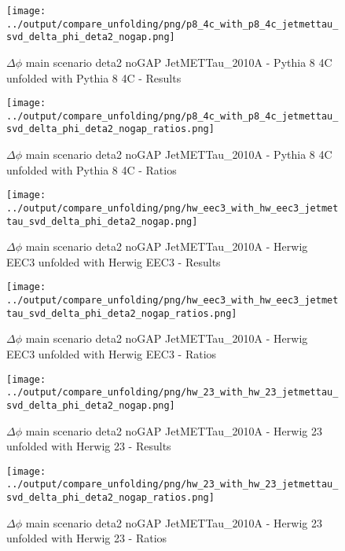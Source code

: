 \documentclass[11pt]{book}
\begin{document}
\begin{figure}[ht]
\centering
\texttt{[image: ../output/compare\_unfolding/png/p8\_4c\_with\_p8\_4c\_jetmettau\_svd\_delta\_phi\_deta2\_nogap.png]}
\caption{$\Delta\phi$ main scenario deta2 noGAP JetMETTau\_2010A - Pythia 8 4C unfolded with Pythia 8 4C - Results}
\label{p8_p8_jetmettau_svd_delta_phi_deta2_nogap_a}
\end{figure}

\begin{figure}[ht]
\centering
\texttt{[image: ../output/compare\_unfolding/png/p8\_4c\_with\_p8\_4c\_jetmettau\_svd\_delta\_phi\_deta2\_nogap\_ratios.png]}
\caption{$\Delta\phi$ main scenario deta2 noGAP JetMETTau\_2010A - Pythia 8 4C unfolded with Pythia 8 4C - Ratios}
\label{p8_p8_jetmettau_svd_delta_phi_deta2_nogap_b}
\end{figure}

\begin{figure}[ht]
\centering
\texttt{[image: ../output/compare\_unfolding/png/hw\_eec3\_with\_hw\_eec3\_jetmettau\_svd\_delta\_phi\_deta2\_nogap.png]}
\caption{$\Delta\phi$ main scenario deta2 noGAP JetMETTau\_2010A - Herwig EEC3 unfolded with Herwig EEC3 - Results}
\label{hw_eec3_hw_eec3_jetmettau_svd_delta_phi_deta2_nogap_a}
\end{figure}

\begin{figure}[ht]
\centering
\texttt{[image: ../output/compare\_unfolding/png/hw\_eec3\_with\_hw\_eec3\_jetmettau\_svd\_delta\_phi\_deta2\_nogap\_ratios.png]}
\caption{$\Delta\phi$ main scenario deta2 noGAP JetMETTau\_2010A - Herwig EEC3 unfolded with Herwig EEC3 - Ratios}
\label{hw_eec3_hw_eec3_jetmettau_svd_delta_phi_deta2_nogap_b}
\end{figure}

\begin{figure}[ht]
\centering
\texttt{[image: ../output/compare\_unfolding/png/hw\_23\_with\_hw\_23\_jetmettau\_svd\_delta\_phi\_deta2\_nogap.png]}
\caption{$\Delta\phi$ main scenario deta2 noGAP JetMETTau\_2010A - Herwig 23 unfolded with Herwig 23 - Results}
\label{hw_23_hw_23_jetmettau_svd_delta_phi_deta2_nogap_a}
\end{figure}

\begin{figure}[ht]
\centering
\texttt{[image: ../output/compare\_unfolding/png/hw\_23\_with\_hw\_23\_jetmettau\_svd\_delta\_phi\_deta2\_nogap\_ratios.png]}
\caption{$\Delta\phi$ main scenario deta2 noGAP JetMETTau\_2010A - Herwig 23 unfolded with Herwig 23 - Ratios}
\label{hw_23_hw_23_jetmettau_svd_delta_phi_deta2_nogap_b}
\end{figure}
\end{document}
